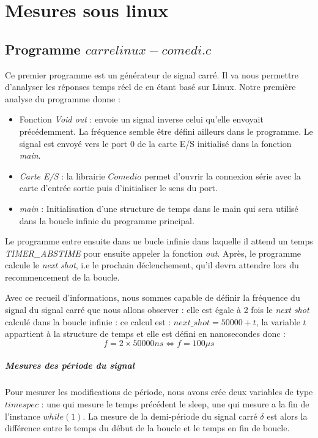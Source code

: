 \section{Mesures sous linux}
\subsection{Programme $carrelinux-comedi.c$}
Ce premier programme est un générateur de signal carré. Il va nous permettre d'analyser les réponses temps réel de en étant basé sur Linux. Notre première analyse du programme donne :\begin{itemize}
\item Fonction \emph{Void out} : envoie un signal inverse  celui qu'elle envoyait précédemment. La fréquence semble être défini ailleurs dans le programme. Le signal est envoyé vers le port 0 de la carte E/S initialisé dans la fonction \emph{main}.
\item \emph{Carte E/S} : la librairie $Comedio$ permet d'ouvrir la connexion série avec la carte d'entrée sortie puis d'initialiser le sens du port.
\item \emph{main} : Initialisation d'une structure de temps dans le main qui sera utilisé dans la boucle infinie du programme principal.
\end{itemize}
Le programme entre ensuite dans ue bucle infinie dans laquelle il attend un temps \emph{TIMER\_ABSTIME} pour ensuite appeler la fonction \emph{out}. Après, le programme calcule le \emph{next shot}, i.e le prochain déclenchement, qu'il devra attendre lors du recommencement de la boucle.

Avec ce recueil d'informations, nous sommes capable de définir la fréquence du signal du signal carré que nous allons observer : elle est égale à 2 fois le \emph{next shot} calculé dans la boucle infinie : ce calcul est : $next\_shot = 50 000 + t$, la variable $t$ appartient à la structure de temps et elle est défini en nanosecondes donc : \begin{equation}
f = 2\times 50 000ns \Leftrightarrow f= 100\mu s
\end{equation} 

\subparagraph{Mesures des période du signal}
Pour mesurer les modifications de période, nous avons crée deux variables de type $timespec$ : une qui mesure le temps précédent le sleep, une qui mesure a la fin de l'instance $while(1)$. La mesure de la demi-période du signal carré $\delta$ est alors la différence entre le temps du début de la boucle et le temps en fin de boucle.  

